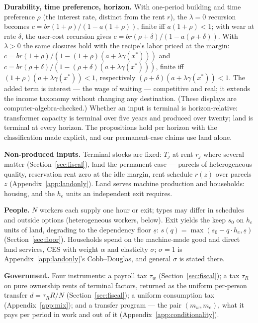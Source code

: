 \documentclass[12pt]{article}
\theoremstyle{plain}
\begin{document}
\textbf{Durability, time preference, horizon.} With one-period building and time preference $\rho$ (the interest rate, distinct from the rent $r$), the $\lambda = 0$ recursion becomes $c = br(1+\rho )/(1 - a(1+\rho ))$, finite iff $a(1+\rho ) < 1$; with wear at rate $\delta$, the user-cost recursion gives $c = br(\rho +\delta )/(1 - a(\rho +\delta ))$. With $\lambda > 0$ the same closures hold with the recipe's labor priced at the margin: $c = br(1+\rho )/(1 - (1+\rho )(a + \lambda \gamma (x^*)))$ and $c = br(\rho +\delta )/(1 - (\rho +\delta )(a + \lambda \gamma (x^*)))$, finite iff $(1+\rho )(a + \lambda \gamma (x^*)) < 1$, respectively $(\rho +\delta )(a + \lambda \gamma (x^*)) < 1$. The added term is interest --- the wage of waiting --- competitive and real; it extends the income taxonomy without changing any destination. (These displays are computer-algebra-checked.) Whether an input is terminal is horizon-relative: transformer capacity is terminal over five years and produced over twenty; land is terminal at every horizon. The propositions hold per horizon with the classification made explicit, and our permanent-case claims use land alone.

\textbf{Non-produced inputs.} Terminal stocks are fixed: $T_j$ at rent $r_j$ where several matter (Section~\ref{sec:fiscal}), land the permanent case --- parcels of heterogeneous quality, reservation rent zero at the idle margin, rent schedule $r(z)$ over parcels $z$ (Appendix~\ref{app:landonly}). Land serves machine production and households: housing, and the $h_e$ units an independent exit requires.

\textbf{People.} $N$ workers each supply one hour or exit; types may differ in schedules and outside options (heterogeneous workers, below). Exit yields the keep $s_0$ on $h_e$ units of land, degrading to the dependency floor $\underline{s}$: $s(q) = \max(s_0 - q\cdot h_e, \underline{s})$ (Section~\ref{sec:floor}). Households spend on the machine-made good and direct land services, CES with weight $\alpha$ and elasticity $\sigma$; $\sigma = 1$ is Appendix~\ref{app:landonly}'s Cobb--Douglas, and general $\sigma$ is stated there.

\textbf{Government.} Four instruments: a payroll tax $\tau _w$ (Section~\ref{sec:fiscal}); a tax $\tau _R$ on pure ownership rents of terminal factors, returned as the uniform per-person transfer $d = \tau _R R/N$ (Section~\ref{sec:fiscal}); a uniform consumption tax (Appendix~\ref{app:mix}); and a transfer program --- the pair $(m_w,m_e)$, what it pays per period in work and out of it (Appendix~\ref{app:conditionality}).
\end{document}
